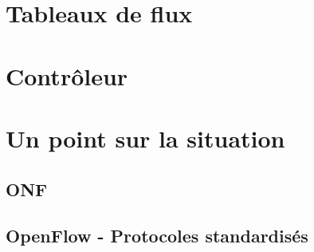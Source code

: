 \clearpage

\section{Tableaux de flux}

\section{Contrôleur}

\section{Un point sur la situation}
\subsection{ONF}

\subsection{OpenFlow - Protocoles standardisés}
